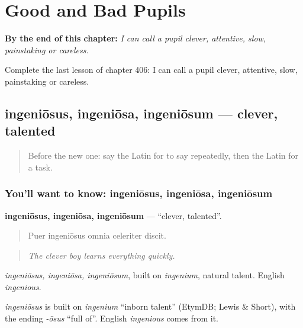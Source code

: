 
\chapter{Good and Bad Pupils}
\label{ch:la-good-and-bad-pupils}

\begin{chapteropening}
\textbf{By the end of this chapter:} \emph{I can call a pupil clever, attentive, slow, painstaking or careless.}

Complete the last lesson of chapter 406: I can call a pupil clever, attentive, slow, painstaking or careless.
\end{chapteropening}

\section[ingeniōsus, ingeniōsa, ingeniōsum]{ingeniōsus, ingeniōsa, ingeniōsum — clever, talented}

\label{lesson:LA-C406-ingeniosus}



\begin{quote}
Before the new one: say the Latin for to say repeatedly, then the Latin for a task.
\end{quote}

\subsection*{You'll want to know: ingeniōsus, ingeniōsa, ingeniōsum}
\textbf{ingeniōsus, ingeniōsa, ingeniōsum} — \textquotedblleft{}clever, talented\textquotedblright{}.

\begin{quote}
Puer ingeniōsus omnia celeriter discit.
\end{quote}

\begin{quote}
\emph{The clever boy learns everything quickly.}
\end{quote}

\emph{ingeniōsus, ingeniōsa, ingeniōsum}, built on \emph{ingenium}, natural talent. English \emph{ingenious}.

\begin{cousinweb}
\emph{ingeniōsus} is built on \emph{ingenium} \textquotedblleft{}inborn talent\textquotedblright{} (EtymDB; Lewis \& Short), with the ending \emph{-ōsus} \textquotedblleft{}full of\textquotedblright{}. English \emph{ingenious} comes from it.
\end{cousinweb}

